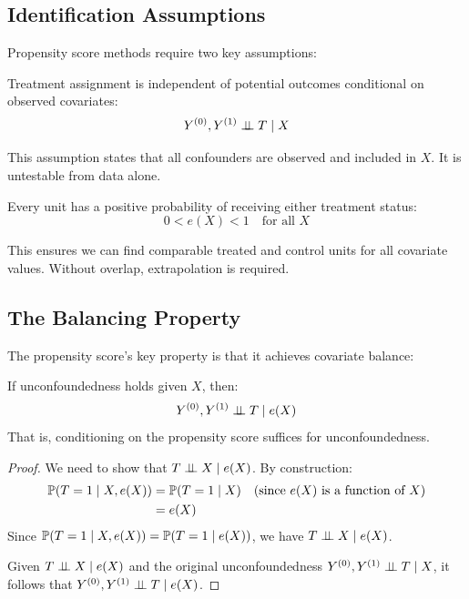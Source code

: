 \subsection{Identification Assumptions}

Propensity score methods require two key assumptions:

\begin{assumption}
\label{assump:unconfound}
Treatment assignment is independent of potential outcomes conditional on observed covariates:
\begin{equation}
Y^{(0)}, Y^{(1)} \perp\!\!\!\perp T \mid X
\label{eq:psm_unconfoundedness}
\end{equation}
\end{assumption}

This assumption states that all confounders are observed and included in $X$. It is untestable from data alone.

\begin{assumption}
\label{assump:overlap}
Every unit has a positive probability of receiving either treatment status:
\begin{equation}
0 < e(X) < 1 \quad \text{for all } X
\label{eq:overlap}
\end{equation}
\end{assumption}

This ensures we can find comparable treated and control units for all covariate values. Without overlap, extrapolation is required.

\subsection{The Balancing Property}

The propensity score's key property is that it achieves covariate balance:

\begin{theorem}
\label{thm:balancing}
If unconfoundedness holds given $X$, then:
\begin{equation}
Y^{(0)}, Y^{(1)} \perp\!\!\!\perp T \mid e(X)
\label{eq:ps_unconfound}
\end{equation}
That is, conditioning on the propensity score suffices for unconfoundedness.
\end{theorem}

\begin{proof}
We need to show that $T \perp\!\!\!\perp X \mid e(X)$. By construction:
\begin{align*}
\mathbb{P}(T = 1 \mid X, e(X)) &= \mathbb{P}(T = 1 \mid X) \quad \text{(since } e(X) \text{ is a function of } X\text{)} \\
&= e(X)
\end{align*}
Since $\mathbb{P}(T = 1 \mid X, e(X)) = \mathbb{P}(T = 1 \mid e(X))$, we have $T \perp\!\!\!\perp X \mid e(X)$.

Given $T \perp\!\!\!\perp X \mid e(X)$ and the original unconfoundedness $Y^{(0)}, Y^{(1)} \perp\!\!\!\perp T \mid X$, it follows that $Y^{(0)}, Y^{(1)} \perp\!\!\!\perp T \mid e(X)$.
\end{proof}

